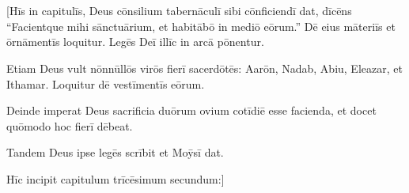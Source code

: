 \chapter{}


\vspace*{-1.4cm}
\thispagestyle{empty}

[Hīs in capitulīs, Deus cōnsilium tabernāculī sibi cōnficiendī dat, 
dīcēns ``Facientque mihi sānctuārium,
et habitābō in mediō eōrum.'' Dē eius māteriīs et ōrnāmentīs loquitur. 
Legēs Deī illīc in arcā pōnentur.

Etiam Deus vult nōnnūllōs virōs fierī sacerdōtēs: Aarōn, Nadab, Abiu, Eleazar, et Ithamar. Loquitur dē vestīmentīs eōrum.

Deinde imperat Deus sacrificia duōrum ovium cotīdiē esse facienda, et docet quōmodo hoc fierī dēbeat.

Tandem Deus ipse legēs scrībit et Moȳsī dat.

Hīc incipit capitulum trīcēsimum secundum:]



